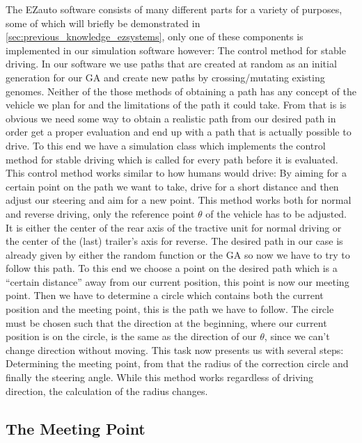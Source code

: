 The EZauto software consists of many different parts for a variety of purposes, some of which will briefly be demonstrated in \ref{sec:previous_knowledge_ezsystems}, only one of these components is implemented in our simulation software however: The control method for stable driving. \cite{12}
In our software we use paths that are created at random as an initial generation for our GA and create new paths by crossing/mutating existing genomes. Neither of the those methods of obtaining a path has any concept of the vehicle we plan for and the limitations of the path it could take. From that is is obvious we need some way to obtain a realistic path from our desired path in order get a proper evaluation and end up with a path that is actually possible to drive. To this end we have a simulation class which implements the control method for stable driving which is called for every path before it is evaluated. This control method works similar to how humans would drive: By aiming for a certain point on the path we want to take, drive for a short distance and then adjust our steering and aim for a new point. \cite{31,32} This method works both for normal and reverse driving, only the reference point $\theta$ of the vehicle has to be adjusted. It is either the center of the rear axis of the tractive unit for normal driving or the center of the (last) trailer's axis for reverse. 
The desired path in our case is already given by either the random function or the GA so now we have to try to follow this path. To this end we choose a point on the desired path which is a "`certain distance"' away from our current position, this point is now our meeting point. Then we have to determine a circle which contains both the current position and the meeting point, this is the path we have to follow. The circle must be chosen such that the direction at the beginning, where our current position is on the circle, is the same as the direction of our $\theta$, since we can't change direction without moving.
This task now presents us with several steps: Determining the meeting point, from that the radius of the correction circle and finally the steering angle. While this method works regardless of driving direction, the calculation of the radius changes.

\subsection{The Meeting Point}
\label{sec:meeting_point}

